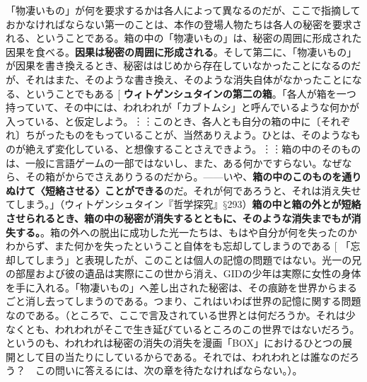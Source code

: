 \documentclass[9pt,b5j,twoside,twocolumn]{utarticle}
\makeatletter
\def\yakuchu{%
\@ifnextchar[\@xfootnote %
{\stepcounter{yakuchu}%
\protected@xdef\@thefnmark{\theyakuchu}%
\@footnotemark\@footnotetext}}
\makeatother
\begin{document}
「物凄いもの」が何を要求するかは各人によって異なるのだが、ここで指摘しておかなければならない第一のことは、本作の登場人物たちは各人の秘密を要求される、ということである。箱の中の「物凄いもの」は、秘密の周囲に形成された因果を食べる。\textbf{因果は秘密の周囲に形成される}。そして第二に、「物凄いもの」が因果を書き換えるとき、秘密ははじめから存在していなかったことになるのだが、それはまた、そのような書き換え、そのような消失自体がなかったことになる、ということでもある\yakuchu{\textbf{ウィトゲンシュタインの第二の箱}。「各人が箱を一つ持っていて、その中には、われわれが「カブトムシ」と呼んでいるような何かが入っている、と仮定しよう。︙︙このとき、各人とも自分の箱の中に〔それぞれ〕ちがったものをもっていることが、当然ありえよう。ひとは、そのようなものが絶えず変化している、と想像することさえできよう。︙︙箱の中のそのものは、一般に言語ゲームの一部ではないし、また、ある何かですらない。なぜなら、その箱がからでさえありうるのだから。------いや、\textbf{箱の中のこのものを通りぬけて〈短絡させる〉ことができる}のだ。それが何であろうと、それは消え失せてしまう。」（ウィトゲンシュタイン『哲学探究』$§$293）\textbf{箱の中と箱の外とが短絡させられるとき、箱の中の秘密が消失するとともに、そのような消失までもが消失する。}}。箱の外への脱出に成功した光一たちは、もはや自分が何を失ったのかわからず、また何かを失ったということ自体をも忘却してしまうのである\yakuchu{「忘却してしまう」と表現したが、このことは個人の記憶の問題ではない。光一の兄の部屋および彼の遺品は実際にこの世から消え、GIDの少年は実際に女性の身体を手に入れる。「物凄いもの」へ差し出された秘密は、その痕跡を世界からまるごと消し去ってしまうのである。つまり、これはいわば世界の記憶に関する問題なのである。（ところで、ここで言及されている世界とは何だろうか。それは少なくとも、われわれがそこで生き延びているところのこの世界ではないだろう。というのも、われわれは秘密の消失の消失を漫画「BOX」におけるひとつの展開として目の当たりにしているからである。それでは、われわれとは誰なのだろう？　この問いに答えるには、次の章を待たなければならない。）}。
\end{document}
